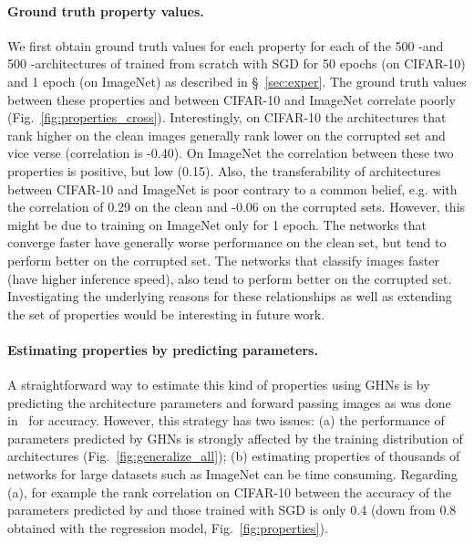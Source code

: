 \paragraph{Ground truth property values.} We first obtain ground truth values for each property for each of the 500 \iid-\iidval and 500 \iid-\iidtest architectures of \dataset trained from scratch with SGD for 50 epochs (on CIFAR-10) and 1 epoch (on ImageNet) as described in \S~\ref{sec:exper}. The ground truth values between these properties and between CIFAR-10 and ImageNet correlate poorly (Fig.~\ref{fig:properties_cross}). Interestingly, on CIFAR-10 the architectures that rank higher on the clean images generally rank lower on the corrupted set and vice verse (correlation is -0.40). On ImageNet the correlation between these two properties is positive, but low (0.15). Also, the transferability of architectures between CIFAR-10 and ImageNet is poor contrary to a common belief, e.g. with the correlation of 0.29 on the clean and -0.06 on the corrupted sets. However, this might be due to training on ImageNet only for 1 epoch. The networks that converge faster have generally worse performance on the clean set, but tend to perform better on the corrupted set. The networks that classify images faster (have higher inference speed), also tend to perform better on the corrupted set. Investigating the underlying reasons for these relationships as well as extending the set of properties would be interesting in future work.


\paragraph{Estimating properties by predicting parameters.}  A straightforward way to estimate this kind of properties using GHNs is by predicting the architecture parameters and forward passing images as was done in~\cite{zhang2018graph} for accuracy. 
However, this strategy has two issues: (a) the performance of parameters predicted by GHNs is strongly affected by the training distribution of architectures (Fig.~\ref{fig:generalize_all});
(b) estimating properties of thousands of networks for large datasets such as ImageNet can be time consuming.
Regarding (a), for example the rank correlation on CIFAR-10 between the accuracy of the parameters predicted by \ghnours and those trained with SGD is only 0.4 (down from 0.8 obtained with the regression model, Fig.~\ref{fig:properties}). 

